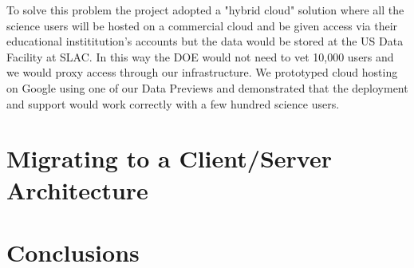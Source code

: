 To solve this problem the project adopted a "hybrid cloud" solution where all the science users will be hosted on a commercial cloud and be given access via their educational instititution's accounts but the data would be stored at the US Data Facility at SLAC.
In this way the DOE would not need to vet 10,000 users and we would proxy access through our infrastructure.
We prototyped cloud hosting on Google using one of our Data Previews \cite{2021arXiv211115030O} and demonstrated that the deployment and support would work correctly with a few hundred science users.

\section{Migrating to a Client/Server Architecture}

\section{Conclusions}
